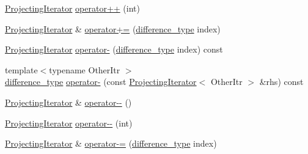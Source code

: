 \begin{DoxyCompactItemize}
\item 
\mbox{\hyperlink{classstanfordcpplib_1_1collections_1_1ProjectingIterator}{Projecting\+Iterator}} \mbox{\hyperlink{classstanfordcpplib_1_1collections_1_1ProjectingIterator_a35576f2e427a1eb75e349d1eb7d0dbf7}{operator++}} (int)
\item 
\mbox{\hyperlink{classstanfordcpplib_1_1collections_1_1ProjectingIterator}{Projecting\+Iterator}} \& \mbox{\hyperlink{classstanfordcpplib_1_1collections_1_1ProjectingIterator_a8a421f1b2b6ea09aeb8441f709c3bece}{operator+=}} (\mbox{\hyperlink{classstanfordcpplib_1_1collections_1_1ProjectingIterator_ad050e8e82b0962bb9ebd0e7c23b436ac}{difference\+\_\+type}} index)
\item 
\mbox{\hyperlink{classstanfordcpplib_1_1collections_1_1ProjectingIterator}{Projecting\+Iterator}} \mbox{\hyperlink{classstanfordcpplib_1_1collections_1_1ProjectingIterator_ae99ddfef65330145f2d9eb85ec233f42}{operator-\/}} (\mbox{\hyperlink{classstanfordcpplib_1_1collections_1_1ProjectingIterator_ad050e8e82b0962bb9ebd0e7c23b436ac}{difference\+\_\+type}} index) const
\item 
{\footnotesize template$<$typename Other\+Itr $>$ }\\\mbox{\hyperlink{classstanfordcpplib_1_1collections_1_1ProjectingIterator_ad050e8e82b0962bb9ebd0e7c23b436ac}{difference\+\_\+type}} \mbox{\hyperlink{classstanfordcpplib_1_1collections_1_1ProjectingIterator_ad568f73385c8fc4b7ce8b1a9b6ff1a2b}{operator-\/}} (const \mbox{\hyperlink{classstanfordcpplib_1_1collections_1_1ProjectingIterator}{Projecting\+Iterator}}$<$ Other\+Itr $>$ \&rhs) const
\item 
\mbox{\hyperlink{classstanfordcpplib_1_1collections_1_1ProjectingIterator}{Projecting\+Iterator}} \& \mbox{\hyperlink{classstanfordcpplib_1_1collections_1_1ProjectingIterator_a2e8236d571ec301658a9247bc325243f}{operator-\/-\/}} ()
\item 
\mbox{\hyperlink{classstanfordcpplib_1_1collections_1_1ProjectingIterator}{Projecting\+Iterator}} \mbox{\hyperlink{classstanfordcpplib_1_1collections_1_1ProjectingIterator_ada1760685f407fded05fffc06344a7e6}{operator-\/-\/}} (int)
\item 
\mbox{\hyperlink{classstanfordcpplib_1_1collections_1_1ProjectingIterator}{Projecting\+Iterator}} \& \mbox{\hyperlink{classstanfordcpplib_1_1collections_1_1ProjectingIterator_a2c43936862d76c8d232710de18c7a5c1}{operator-\/=}} (\mbox{\hyperlink{classstanfordcpplib_1_1collections_1_1ProjectingIterator_ad050e8e82b0962bb9ebd0e7c23b436ac}{difference\+\_\+type}} index)
\item 

\end{DoxyCompactItemize}
